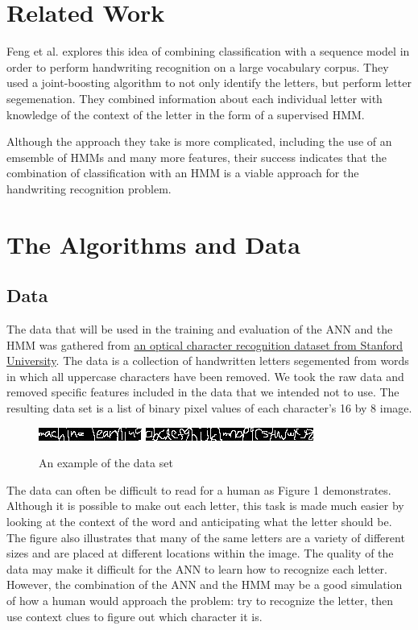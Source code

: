 \documentclass[11pt,a4paper,twocolumn]{article}
\begin{document}
\section{Related Work}

Feng et al.\cite{feng2008hidden} explores this idea of combining classification with a sequence
model in order to perform handwriting recognition on a large vocabulary corpus. They used a
joint-boosting algorithm to not only identify the letters, but perform letter segemenation. They
combined information about each individual letter with knowledge of the context of the letter in the
form of a supervised HMM.

Although the approach they take is more complicated, including the use of an emsemble of HMMs and
many more features, their success indicates that the combination of classification with an HMM is a
viable approach for the handwriting recognition problem.

\section{The Algorithms and Data}

\subsection*{Data}

The data that will be used in the training and evaluation of the ANN and the HMM was gathered from
\href{http://ai.stanford.edu/~btaskar/ocr/}{an optical character recognition dataset from
Stanford University}.
The data is a collection of handwritten letters segemented from words in which all uppercase
characters have been removed. We took the raw data and removed specific features included in the
data that we intended not to use. The resulting data set is a list of binary pixel values of each
character's 16 by 8 image.  \begin{figure}[h]
    \centering
    \includegraphics{img/ml.jpg}
    \includegraphics{img/alphabet.jpg}
    \caption{An example of the data set}
\end{figure}

The data can often be difficult to read for a human as Figure 1 demonstrates.  Although it is
possible to make out each letter, this task is made much easier by looking at the context of the
word and anticipating what the letter should be. The figure also illustrates that many of the same
letters are a variety of different sizes and are placed at different locations within the image. The
quality of the data may make it difficult for the ANN to learn how to recognize each letter.
However, the combination of the ANN and the HMM may be a good simulation of how a human would
approach the problem: try to recognize the letter, then use context clues to figure out which
character it is.
\end{document}

